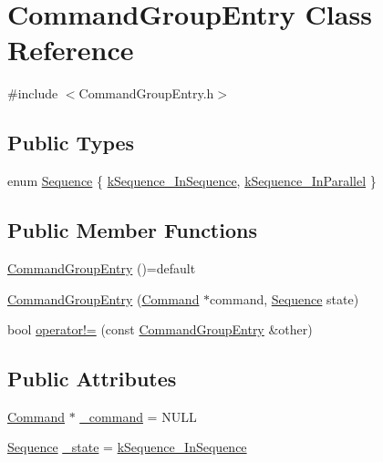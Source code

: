 \hypertarget{classCommandGroupEntry}{\section{Command\-Group\-Entry Class Reference}
\label{classCommandGroupEntry}
}


{\ttfamily \#include $<$Command\-Group\-Entry.\-h$>$}

\subsection*{Public Types}
\begin{DoxyCompactItemize}
\item 
enum \hyperlink{classCommandGroupEntry_a0c435eb6049bef341e92b3550e8f20b1}{Sequence} \{ \hyperlink{classCommandGroupEntry_a0c435eb6049bef341e92b3550e8f20b1a88aa8647af6ba782f9faf0eb8986a730}{k\-Sequence\-\_\-\-In\-Sequence}, 
\hyperlink{classCommandGroupEntry_a0c435eb6049bef341e92b3550e8f20b1a1576e3e1f5d8e12f32ebacb248fee63e}{k\-Sequence\-\_\-\-In\-Parallel}
 \}
\end{DoxyCompactItemize}
\subsection*{Public Member Functions}
\begin{DoxyCompactItemize}
\item 
\hyperlink{classCommandGroupEntry_a64e939b3d002d394ed63079f74fbf144}{Command\-Group\-Entry} ()=default
\item 
\hyperlink{classCommandGroupEntry_a638a9b82f73e4aa5b268eaad4a1c95de}{Command\-Group\-Entry} (\hyperlink{classCommand}{Command} $\ast$command, \hyperlink{classCommandGroupEntry_a0c435eb6049bef341e92b3550e8f20b1}{Sequence} state)
\item 
bool \hyperlink{classCommandGroupEntry_ad12a901f2d52aa1da54020c118f222a5}{operator!=} (const \hyperlink{classCommandGroupEntry}{Command\-Group\-Entry} \&other)
\end{DoxyCompactItemize}
\subsection*{Public Attributes}
\begin{DoxyCompactItemize}
\item 
\hyperlink{classCommand}{Command} $\ast$ \hyperlink{classCommandGroupEntry_a466202de6dd9aed12db553da04c726b2}{\-\_\-command} = N\-U\-L\-L
\item 
\hyperlink{classCommandGroupEntry_a0c435eb6049bef341e92b3550e8f20b1}{Sequence} \hyperlink{classCommandGroupEntry_a3a011ee2d2c871fce8a37dd3cb3d1ddf}{\-\_\-state} = \hyperlink{classCommandGroupEntry_a0c435eb6049bef341e92b3550e8f20b1a88aa8647af6ba782f9faf0eb8986a730}{k\-Sequence\-\_\-\-In\-Sequence}
\end{DoxyCompactItemize}


